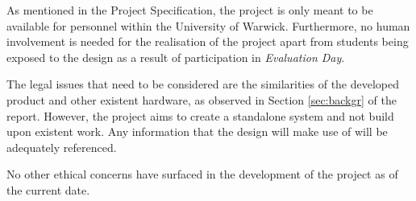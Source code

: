 As mentioned in the Project Specification, the project is only meant to be available for personnel within the University of Warwick. Furthermore, no human involvement is needed for the realisation of the project apart from students being exposed to the design as a result of participation in \textit{Evaluation Day}.

The legal issues that need to be considered are the similarities of the developed product and other existent hardware, as observed in Section \ref{sec:backgr} of the report. However, the project aims to create a standalone system and not build upon existent work. Any information that the design will make use of will be adequately referenced.

No other ethical concerns have surfaced in the development of the project as of the current date.